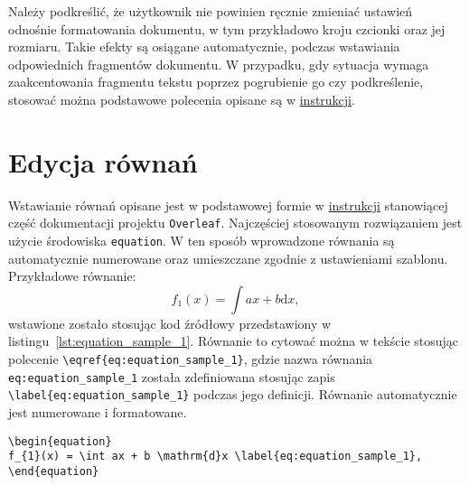 Należy podkreślić, że użytkownik nie powinien ręcznie zmieniać ustawień odnośnie formatowania dokumentu, w tym przykładowo kroju czcionki oraz jej rozmiaru. Takie efekty są osiągane automatycznie, podczas wstawiania odpowiednich fragmentów dokumentu. W przypadku, gdy sytuacja wymaga zaakcentowania fragmentu tekstu poprzez pogrubienie go czy podkreślenie, stosować można podstawowe polecenia opisane są w \href{https://www.overleaf.com/learn/latex/Font_sizes%2C_families%2C_and_styles}{instrukcji}.

\section{Edycja równań}

Wstawianie równań opisane jest w podstawowej formie w \href{https://www.overleaf.com/learn/latex/Mathematical_expressions}{instrukcji} stanowiącej część dokumentacji projektu \texttt{Overleaf}. Najczęściej stosowanym rozwiązaniem jest użycie środowiska \verb|equation|. W ten sposób wprowadzone równania są automatycznie numerowane oraz umieszczane zgodnie z ustawieniami szablonu. Przykładowe równanie:
\begin{equation}
f_{1}(x) = \int ax + b \mathrm{d}x \label{eq:equation_sample_1},
\end{equation}
wstawione zostało stosując kod źródłowy przedstawiony w listingu~\ref{lst:equation_sample_1}. Równanie to cytować można w tekście stosując polecenie \verb|\eqref{eq:equation_sample_1}|, gdzie nazwa równania \verb|eq:equation_sample_1| została zdefiniowana stosując zapis \verb|\label{eq:equation_sample_1}| podczas jego definicji. Równanie automatycznie jest numerowane i formatowane.

\begin{listing}[htb]
\begin{verbatim}
\begin{equation}
f_{1}(x) = \int ax + b \mathrm{d}x \label{eq:equation_sample_1},
\end{equation}
\end{verbatim}
\end{listing}

